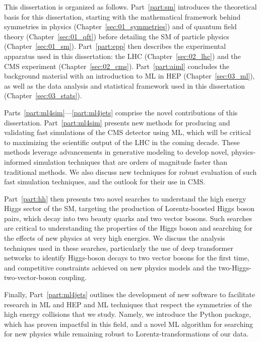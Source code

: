 \begin{dissertationintroduction}
This dissertation is organized as follows.
Part~\ref{part:sm} introduces the theoretical basis for this dissertation, starting with the mathematical framework behind symmetries in physics (Chapter~\ref{sec:01_symmetries}) and of quantum field theory (Chapter~\ref{sec:01_qft}) before detailing the SM of particle physics (Chapter~\ref{sec:01_sm}).
Part~\ref{part:epp} then describes the experimental apparatus used in this dissertation: the LHC (Chapter~\ref{sec:02_lhc}) and the CMS experiment (Chapter~\ref{sec:02_cms}).
Part~\ref{part:aiml} concludes the background material with an introduction to ML in HEP (Chapter~\ref{sec:03_ml}), as well as the data analysis and statistical framework used in this dissertation (Chapter~\ref{sec:03_stats}).


Parts~\ref{part:ml4sim}---\ref{part:ml4jets} comprise the novel contributions of this dissertation.
Part~\ref{part:ml4sim} presents new methods for producing and validating fast simulations of the CMS detector using ML, which will be critical to maximizing the scientific output of the LHC in the coming decade.
These methods leverage advancements in generative modeling to develop novel, physics-informed simulation techniques that are orders of magnitude faster than traditional methods.
We also discuss new techniques for robust evaluation of such fast simulation techniques, and the outlook for their use in CMS.

Part~\ref{part:hh} then presents two novel searches to understand the high energy Higgs sector of the SM, targeting the production of Lorentz-boosted Higgs boson pairs, which decay into two beauty quarks and two vector bosons.
Such searches are critical to understanding the properties of the Higgs boson and searching for the effects of new physics at very high energies.
We discuss the analysis techniques used in these searches, particularly the use of deep transformer networks to identify Higgs-boson decays to two vector bosons for the first time, and competitive constraints achieved on new physics models and the two-Higgs-two-vector-boson coupling.

Finally, Part~\ref{part:ml4jets} outlines the development of new software to facilitate research in ML and HEP and ML techniques that respect the symmetries of the high energy collisions that we study.
Namely, we introduce the \jetnet Python package, which has proven impactful in this field, and a novel ML algorithm for searching for new physics while remaining robust to Lorentz-transformations of our data.


\end{dissertationintroduction}
